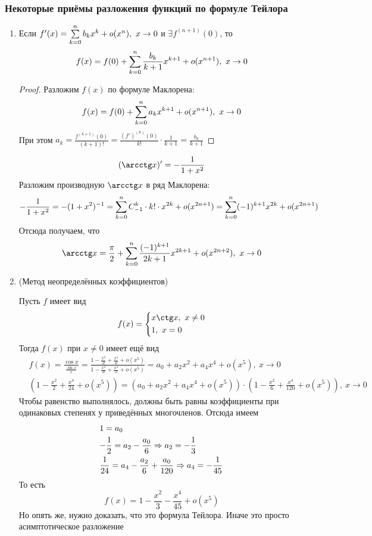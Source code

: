 \subsubsection*{Некоторые приёмы разложения функций по формуле Тейлора}

\begin{enumerate}
	\item Если $f'(x) = \sum\limits_{k = 0}^n b_k x^k + o(x^n),\ x \to 0$ и $\exists f^{(n + 1)}(0)$, то
	\[
		f(x) = f(0) + \sum\limits_{k = 0}^n \frac{b_k}{k + 1} x^{k + 1} + o(x^{n + 1}),\ x \to 0
	\]
	\begin{proof}
		Разложим $f(x)$ по формуле Маклорена:
		\[
		f(x) = f(0) + \sum\limits_{k = 0}^n a_k x^{k + 1} + o(x^{n + 1}),\ x \to 0
		\]
		При этом $a_k = \frac{f^{(k + 1)}(0)}{(k + 1)!} = \frac{(f')^{(k)}(0)}{k!} \cdot \frac{1}{k + 1} = \frac{b_k}{k + 1}$
	\end{proof}
	\begin{example}
		\[
			(\arcctg x)' = -\frac{1}{1 + x^2}
		\]
		Разложим производную $\arcctg x$ в ряд Маклорена:
		\[
			-\frac{1}{1 + x^2} = -(1 + x^2)^{-1} = \sum\limits_{k = 0}^n C_{-1}^k \cdot k! \cdot x^{2k} + o(x^{2n + 1}) = \sum\limits_{k = 0}^n (-1)^{k + 1} x^{2k} + o(x^{2n + 1})
		\]
		Отсюда получаем, что
		\[
			\arcctg x = \frac{\pi}{2} + \suml_{k = 0}^n \frac{(-1)^{k + 1}}{2k + 1} x^{2k + 1} + o(x^{2n + 2}),\ x \to 0
		\]
	\end{example}

	\item (Метод неопределённых коэффициентов)
	\begin{example}
		Пусть $f$ имеет вид
		\[
			f(x) = \System{
				&{x \ctg x,\ x \neq 0}
				\\
				&{1,\ x = 0}
			}
		\]
		Тогда $f(x)$ при $x \neq 0$ имеет ещё вид
		\begin{align*}
			&f(x) = \frac{\cos x}{\frac{\sin x}{x}} = \frac{1 - \frac{x^2}{2!} + \frac{x^4}{4!} + o(x^5)}{1 - \frac{x^2}{3!} + \frac{x^4}{5!} + o(x^5)} = a_0 + a_2x^2 + a_4x^4 + o(x^5),\ x \to 0
			\\
			&\left(1 - \frac{x^2}{2} + \frac{x^4}{24} + o(x^5)\right) = \left(a_0 + a_2x^2 + a_4x^4 + o(x^5)\right) \cdot \left(1 - \frac{x^2}{6} + \frac{x^4}{120} + o(x^5)\right),\ x \to 0
		\end{align*}
		Чтобы равенство выполнялось, должны быть равны коэффициенты при одинаковых степенях у приведённых многочленов. Отсюда имеем
		\begin{align*}
			&{1 = a_0}
			\\
			&{-\frac{1}{2} = a_2 - \frac{a_0}{6} \Rightarrow a_2 = -\frac{1}{3}}
			\\
			&{\frac{1}{24} = a_4 - \frac{a_2}{6} + \frac{a_0}{120} \Rightarrow a_4 = -\frac{1}{45}}
		\end{align*}
		То есть
		\[
			f(x) = 1 - \frac{x^2}{3} - \frac{x^4}{45} + o(x^5)
		\]
		Но опять же, нужно доказать, что это формула Тейлора. Иначе это просто асимптотическое разложение
	\end{example}


\end{enumerate}

